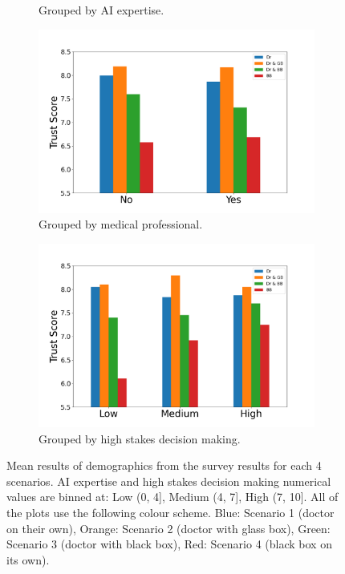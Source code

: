 \documentclass[manuscript,screen,review]{acmart}
\begin{document}
\begin{figure}[ht]
\begin{subfigure}[t]{.45\textwidth}
    \caption{Grouped by AI expertise.}
  \end{subfigure}
  \medskip
  \begin{subfigure}[t]{.45\textwidth}
    \centering
    \includegraphics[width=\linewidth]{graphics/survey_averages/survey_medics_grouped.png}
    \caption{Grouped by medical professional.}
  \end{subfigure}
  \begin{subfigure}[t]{.45\textwidth}
    \centering
    \includegraphics[width=\linewidth]{graphics/survey_averages/survey_stakes_grouped.png}
    \caption{Grouped by high stakes decision making.}
    \label{subfig:high stakes}
  \end{subfigure}
  \caption{Mean results of demographics from the survey results for each 4 scenarios. AI expertise and high stakes decision making numerical values are binned at: Low (0, 4], Medium (4, 7], High (7, 10]. All of the plots use the following colour scheme. Blue: Scenario 1 (doctor on their own), Orange: Scenario 2 (doctor with glass box), Green: Scenario 3 (doctor with black box), Red: Scenario 4 (black box on its own).}
  \label{fig:mean_survey_results}
\end{figure}
\end{document}
